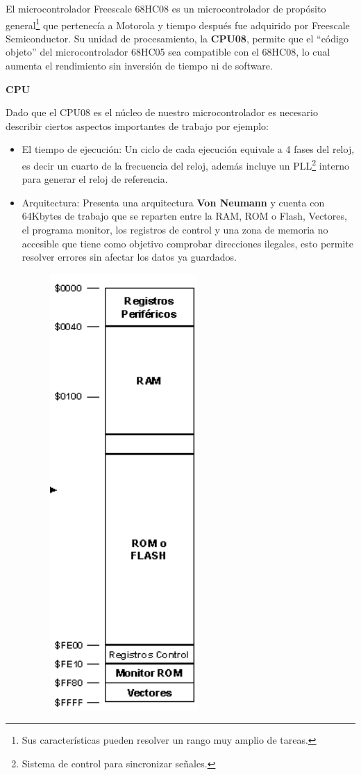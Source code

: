 \documentclass[12pt]{article}
\begin{document}

El microcontrolador Freescale 68HC08 es un microcontrolador de propósito general\footnote{Sus características pueden resolver un rango muy amplio de tareas.} que pertenecía a Motorola y tiempo después fue adquirido por Freescale Semiconductor. Su unidad de procesamiento, la \textbf{CPU08}, permite que el ``código objeto'' del microcontrolador 68HC05 sea compatible con el 68HC08, lo cual aumenta el rendimiento sin inversión de tiempo ni de software.

{\large{\textbf{CPU}}}

Dado que el CPU08 es el núcleo de nuestro microcontrolador es necesario describir ciertos aspectos importantes de trabajo por ejemplo: 
\begin{itemize}
    \item El tiempo de ejecución:
    Un ciclo de cada ejecución equivale a 4 fases del reloj, es decir un cuarto de la frecuencia del reloj, además incluye un PLL\footnote{Sistema de control para sincronizar señales.} interno para generar el reloj de referencia.
    \item Arquitectura: Presenta una arquitectura \textbf{Von Neumann} y cuenta con 64Kbytes de trabajo que se reparten entre la RAM, ROM o Flash, Vectores, el programa monitor, los registros de control y una zona de memoria no accesible que tiene como objetivo comprobar direcciones ilegales, esto permite resolver errores sin afectar los datos ya guardados.
    \begin{figure}[h]
        \centering
        \includegraphics[scale=0.5]{esquema de memoria .png}

\end{figure}
\end{itemize}
\end{document}
